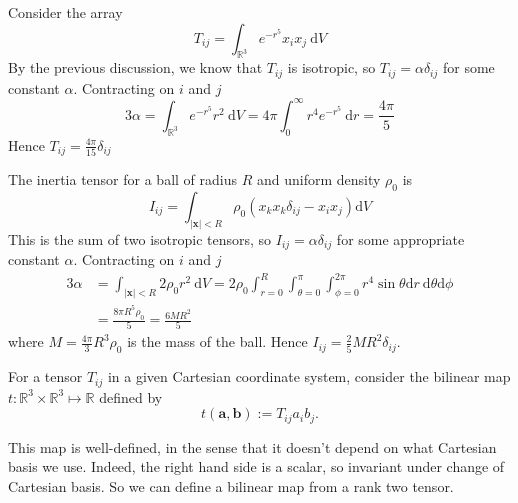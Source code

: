 \begin{example}
    Consider the array
    \[
    T_{i j}=\int_{\mathbb{R}^{3}} e^{-r^{5}} x_{i} x_{j} \mathrm{~d} V
    \]
    By the previous discussion, we know that $T_{i j}$ is isotropic, so $T_{i j}=\alpha \delta_{i j}$ for some constant $\alpha$. Contracting on $i$ and $j$
    \[
    3 \alpha=\int_{\mathbb{R}^{3}} e^{-r^{5}} r^{2} \mathrm{~d} V=4 \pi \int_{0}^{\infty} r^{4} e^{-r^{5}} \mathrm{~d} r=\frac{4 \pi}{5}
    \]
    Hence $T_{i j}=\frac{4 \pi}{15} \delta_{i j}$
\end{example}
\begin{example}
    The inertia tensor for a ball of radius $R$ and uniform density $\rho_{0}$ is
    \[
    I_{i j}=\int_{|\mathbf{x}|<R} \rho_{0}\left(x_{k} x_{k} \delta_{i j}-x_{i} x_{j}\right) \mathrm{d} V
    \]
    This is the sum of two isotropic tensors, so $I_{i j}=\alpha \delta_{i j}$ for some appropriate constant $\alpha$. Contracting on $i$ and $j$
    \begin{align*}
        3 \alpha&=\int_{|\mathbf{x}|<R} 2 \rho_{0} r^{2} \mathrm{~d} V=2 \rho_{0} \int_{r=0}^{R} \int_{\theta=0}^{\pi} \int_{\phi=0}^{2 \pi} r^{4} \sin \theta \mathrm{d} r \mathrm{~d} \theta \mathrm{d} \phi\\ &=\frac{8 \pi R^{5} \rho_{0}}{5}=\frac{6 M R^{2}}{5}
    \end{align*}
    where $M=\frac{4 \pi}{3} R^{3} \rho_{0}$ is the mass of the ball. Hence $I_{i j}=\frac{2}{5} M R^{2} \delta_{i j}$.
\end{example}

For a tensor $T_{i j}$ in a given Cartesian coordinate system, consider the bilinear map $t: \mathbb{R}^{3} \times \mathbb{R}^{3} \mapsto \mathbb{R}$ defined by
\[
t(\mathbf{a}, \mathbf{b}):=T_{i j} a_{i} b_{j}.
\]

This map is well-defined, in the sense that it doesn't depend on what Cartesian basis we use. Indeed, the right hand side is a scalar, so invariant under change of Cartesian basis. So we can define a bilinear map from a rank two tensor.

